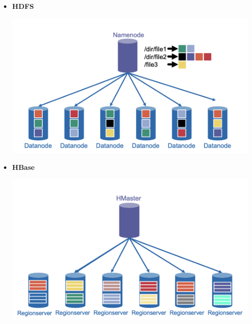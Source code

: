 \documentclass{article}
\begin{document}
\begin{itemize}
    \item \textbf{HDFS}
    
    \includegraphics[width=\linewidth]{img/hdfsov.png}
    \item \textbf{HBase}
    
    \includegraphics[width=\linewidth]{img/hbaseov.png}
\end{itemize}
\end{document}
